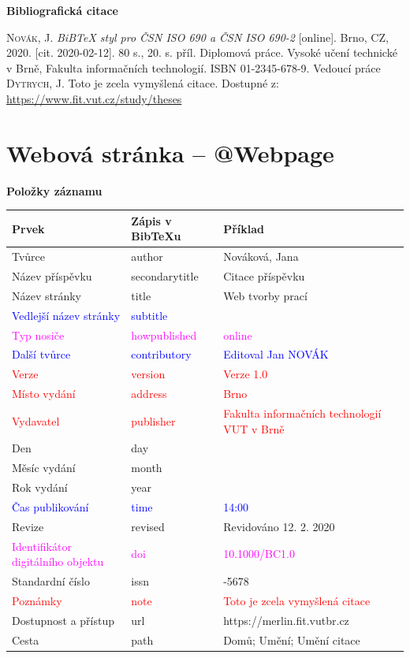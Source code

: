 \bigskip

\noindent \textbf{Bibliografická citace}

\medskip

\noindent \textsc{Novák}, J. \textit{BiBTeX styl pro ČSN ISO 690 a ČSN ISO 690-2} [online]. Brno, CZ, 2020. [cit. 2020-02-12]. 80 s., 20. s. příl. Diplomová práce. Vysoké učení technické v Brně, Fakulta informačních technologií. ISBN 01-2345-678-9. Vedoucí práce \textsc{Dytrych}, J. Toto je zcela vymyšlená citace. Dostupné z: \url{https://www.fit.vut.cz/study/theses}
\newpage
\section*{Webová stránka -- @Webpage}
\label{pr-webpage}
\noindent \textbf{Položky záznamu}

\medskip

\begin{tabularx}{0.95\linewidth}{>{\raggedright\arraybackslash}X X >{\raggedright\arraybackslash}X}
    Prvek & Zápis v BibTeXu & Příklad\\\hline
    Tvůrce & author & Nováková, Jana\\
    Název příspěvku & secondarytitle & Citace příspěvku\\
    Název stránky & title & Web tvorby prací\\
    \textcolor{blue}{Vedlejší název stránky}  &  \textcolor{blue}{subtitle} & \\
    \textcolor{magenta}{Typ nosiče} & \textcolor{magenta}{howpublished} & \textcolor{magenta}{online}\\
    \textcolor{blue}{Další tvůrce} & \textcolor{blue}{contributory} & \textcolor{blue}{Editoval Jan NOVÁK}\\
    \textcolor{red}{Verze} & \textcolor{red}{version} & \textcolor{red}{Verze 1.0}\\
    \textcolor{red}{Místo vydání} & \textcolor{red}{address} & \textcolor{red}{Brno}\\
    \textcolor{red}{Vydavatel} & \textcolor{red}{publisher} & \textcolor{red}{Fakulta informačních technologií VUT v Brně}\\
    Den & day & 12\\
    Měsíc vydání & month & 2\\
    Rok vydání & year & 2020\\
    \textcolor{blue}{Čas publikování} & \textcolor{blue}{time} & \textcolor{blue}{14:00}\\
    Revize & revised & Revidováno 12. 2. 2020\\
    \textcolor{magenta}{Identifikátor digitálního objektu} & \textcolor{magenta}{doi} & \textcolor{magenta}{10.1000/BC1.0}\\
    Standardní číslo & issn & 1234-5678\\
    \textcolor{red}{Poznámky} & \textcolor{red}{note} & \textcolor{red}{Toto je zcela vymyšlená citace}\\
    Dostupnost a přístup & url & https://merlin.fit.vutbr.cz\\
    Cesta & path & Domů; Umění; Umění citace
\end{tabularx}

